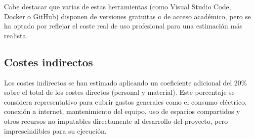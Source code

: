 \begin{table}[H]
\centering
\small
\caption{Elementos utilizados y coste amortizado durante el desarrollo (80 días)}
%
\end{table}


Cabe destacar que varias de estas herramientas (como Visual Studio Code, Docker o GitHub) disponen de versiones gratuitas o de acceso académico, pero se ha optado por reflejar el coste real de uso profesional para una estimación más realista.

\subsection{Costes indirectos}

Los costes indirectos se han estimado aplicando un coeficiente adicional del 20\% sobre el total de los costes directos (personal y material). Este porcentaje se considera representativo para cubrir gastos generales como el consumo eléctrico, conexión a internet, mantenimiento del equipo, uso de espacios compartidos y otros recursos no imputables directamente al desarrollo del proyecto, pero imprescindibles para su ejecución.

